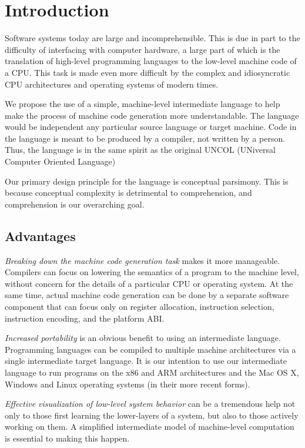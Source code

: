\section{Introduction}

Software systems today are large and incomprehensible.
This is due in part to the difficulty
of interfacing with computer hardware,
a large part of which is the translation
of high-level programming languages to the
low-level machine code of a CPU. This task is
made even more difficult by the complex and idiosyncratic
CPU architectures and operating systems of modern times.

We propose the use of a simple, machine-level
intermediate language to help make
the process of machine code generation
more understandable.
The language would be independent any particular
source language or target machine.
Code in the language is meant to be
produced by a compiler, not written by a person.
Thus, the language is in the same
spirit as the original UNCOL (UNiversal
Computer Oriented Language)~\cite{strong1958problem}

Our primary design principle for the language
is conceptual parsimony. This is because conceptual
complexity is detrimental to comprehension, and
comprehension is our overarching goal.

\subsection{Advantages}

\emph{Breaking down the machine code generation task} makes
it more manageable. Compilers can focus on lowering
the semantics of a program to the machine level,
without concern for the details of a particular CPU or operating system.
At the same time, actual machine code generation can be done
by a separate software component that can focus only on
register allocation, instruction selection, instruction
encoding, and the platform ABI.

\emph{Increased portability} is an obvious benefit to using an intermediate language.
Programming languages can be compiled to multiple machine architectures
via a single intermediate target language.
It is our intention to use our intermediate language
to run programs on the x86 and ARM architectures and
the Mac OS X, Windows and Linux operating systems (in their more recent forms).

\emph{Effective visualization of low-level system behavior} can be a tremendous help
not only to those first learning the lower-layers of a system, but
also to those actively working on them.
A simplified intermediate model of machine-level computation is
essential to making this happen.


